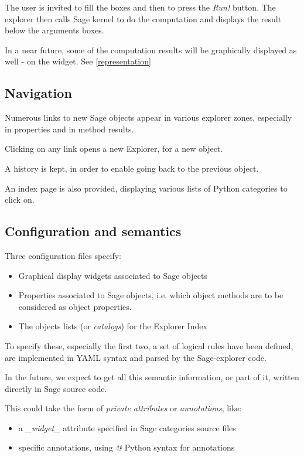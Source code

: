 \documentclass{deliverablereport}
\begin{document}
The user is invited to fill the boxes and then to press the
\emph{Run!} button. The explorer then calls Sage kernel to do the
computation and displays the result below the arguments boxes.

In a near future, some of the computation results will be graphically
displayed as well - on the widget. See \ref{representation}


\subsection{Navigation}

Numerous links to new Sage objects appear in various explorer zones,
especially in properties and in method results.

Clicking on any link opens a new Explorer, for a new object.

A history is kept, in order to enable going back to the previous object.

An index page is also provided, displaying various lists of Python
categories to click on.

\subsection{Configuration and semantics}
\label{semantics}

Three configuration files specify:

\begin{itemize}
\item Graphical display widgets associated to Sage objects
  \item Properties associated to Sage objects, i.e. which object methods are
    to be considered as object properties.
\item The objects lists (or \emph{catalogs}) for the Explorer Index
\end{itemize}

To specify these, especially the first two, a set of logical rules
have been defined, are implemented in YAML syntax and parsed by the
Sage-explorer code.

In the future, we expect to get all this semantic information, or part of it,
written directly in Sage source code.

This could take the form of \emph{private attributes} or \emph{annotations}, like:

\begin{itemize}
\item a \emph{\_widget\_} attribute specified in Sage categories source files
\item specific annotations, using \emph{@} Python syntax for annotations
  \end{itemize}
\end{document}
